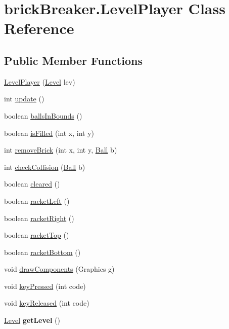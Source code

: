 \hypertarget{classbrick_breaker_1_1_level_player}{
\section{brickBreaker.LevelPlayer Class Reference}
\label{classbrick_breaker_1_1_level_player}
}
\subsection*{Public Member Functions}
\begin{DoxyCompactItemize}
\item 
\hyperlink{classbrick_breaker_1_1_level_player_a34f8b2db5684239038d4b5f33d7c93f6}{LevelPlayer} (\hyperlink{classbrick_breaker_1_1_level}{Level} lev)
\item 
int \hyperlink{classbrick_breaker_1_1_level_player_ad141c01fb30f6982c5b7932dd8ca901a}{update} ()
\item 
boolean \hyperlink{classbrick_breaker_1_1_level_player_aa5069116c7e903a1cf8d6663260905b2}{ballsInBounds} ()
\item 
boolean \hyperlink{classbrick_breaker_1_1_level_player_a298ae45b06799f0299d4b518075b9599}{isFilled} (int x, int y)
\item 
int \hyperlink{classbrick_breaker_1_1_level_player_a6aa16018bbba510ef65b6d43baaf8dc3}{removeBrick} (int x, int y, \hyperlink{classbrick_breaker_1_1_ball}{Ball} b)
\item 
int \hyperlink{classbrick_breaker_1_1_level_player_a0faa4b97a3ae3d8f473a5b70de9ab45b}{checkCollision} (\hyperlink{classbrick_breaker_1_1_ball}{Ball} b)
\item 
boolean \hyperlink{classbrick_breaker_1_1_level_player_a952e8b565a2c36ac471f7ab020972294}{cleared} ()
\item 
boolean \hyperlink{classbrick_breaker_1_1_level_player_ad4ab8305c27d7ee5a1c4a05488705a53}{racketLeft} ()
\item 
boolean \hyperlink{classbrick_breaker_1_1_level_player_a95c24168beb56156276b636954f210bc}{racketRight} ()
\item 
boolean \hyperlink{classbrick_breaker_1_1_level_player_ae31f4ca8b38e813587e795d681edfb0d}{racketTop} ()
\item 
boolean \hyperlink{classbrick_breaker_1_1_level_player_a6a7980415c6fed32a9f6c9271bae6220}{racketBottom} ()
\item 
void \hyperlink{classbrick_breaker_1_1_level_player_ae54384ce113e96099dd14d73acd7de5e}{drawComponents} (Graphics g)
\item 
void \hyperlink{classbrick_breaker_1_1_level_player_a1ebfab24bc0e7e7e6851f7856e486d8d}{keyPressed} (int code)
\item 
void \hyperlink{classbrick_breaker_1_1_level_player_a32dd9508bac5135b7f2706b807ada71e}{keyReleased} (int code)
\item 
\hypertarget{classbrick_breaker_1_1_level_player_a732aa75e9304df978a19452b95b6ee87}{
\hyperlink{classbrick_breaker_1_1_level}{Level} {\bfseries getLevel} ()}
\label{classbrick_breaker_1_1_level_player_a732aa75e9304df978a19452b95b6ee87}

\end{DoxyCompactItemize}
